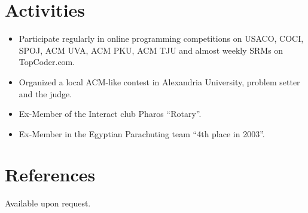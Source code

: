\documentclass{res}
\begin{document}
\begin{resume}
\section{Activities}          
    \begin{itemize}
    \item Participate regularly in online programming competitions on USACO, COCI, SPOJ, ACM UVA, ACM PKU, ACM TJU and almost weekly SRMs on TopCoder.com.
    \item Organized a local ACM-like contest in Alexandria University, problem setter and the judge.
    \item Ex-Member of the Interact club Pharos ``Rotary''.
    \item Ex-Member in the Egyptian Parachuting team ``4th place in 2003''.
    \end{itemize}

\section {References}
% 
Available upon request.

\end{resume}
\end{document}
